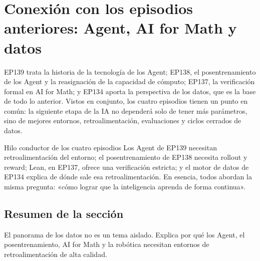 \section{Conexión con los episodios anteriores: Agent, AI for Math y datos}

EP139 trata la historia de la tecnología de los Agent; EP138, el posentrenamiento de los Agent y la reasignación de la capacidad de cómputo; EP137, la verificación formal en AI for Math; y EP134 aporta la perspectiva de los datos, que es la base de todo lo anterior. Vistos en conjunto, los cuatro episodios tienen un punto en común: la siguiente etapa de la IA no dependerá solo de tener más parámetros, sino de mejores entornos, retroalimentación, evaluaciones y ciclos cerrados de datos.

\begin{knowledgebox}{Hilo conductor de los cuatro episodios}
Los Agent de EP139 necesitan retroalimentación del entorno; el posentrenamiento de EP138 necesita rollout y reward; Lean, en EP137, ofrece una verificación estricta; y el motor de datos de EP134 explica de dónde sale esa retroalimentación. En esencia, todos abordan la misma pregunta: «cómo lograr que la inteligencia aprenda de forma continua».
\end{knowledgebox}

\subsection{Resumen de la sección}

El panorama de los datos no es un tema aislado. Explica por qué los Agent, el posentrenamiento, AI for Math y la robótica necesitan entornos de retroalimentación de alta calidad.
